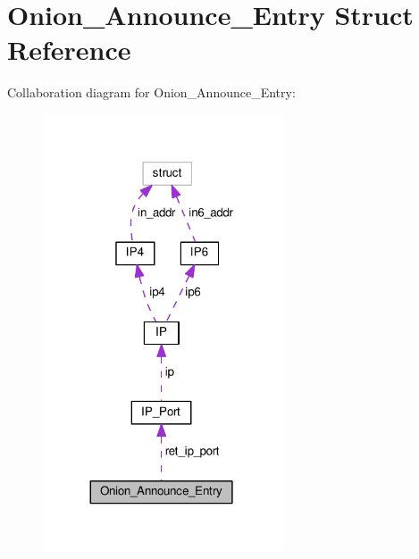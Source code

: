 \hypertarget{struct_onion___announce___entry}{\section{Onion\+\_\+\+Announce\+\_\+\+Entry Struct Reference}
\label{struct_onion___announce___entry}
}


Collaboration diagram for Onion\+\_\+\+Announce\+\_\+\+Entry\+:\nopagebreak
\begin{figure}[H]
\begin{center}
\leavevmode
\includegraphics[width=200pt]{struct_onion___announce___entry__coll__graph}
\end{center}
\end{figure}
